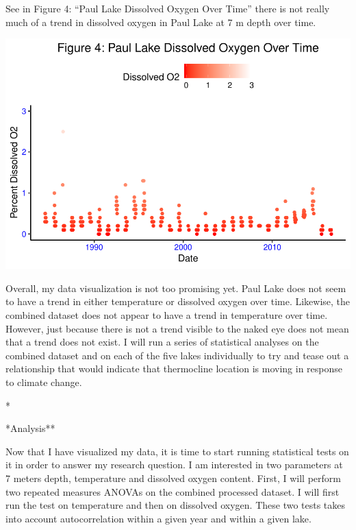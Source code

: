\documentclass[12pt,]{article}
\begin{document}
See in Figure 4: ``Paul Lake Dissolved Oxygen Over Time'' there is not
really much of a trend in dissolved oxygen in Paul Lake at 7 m depth
over time.

\includegraphics{KBollt_ENV872_FinalProject_files/figure-latex/visualization4-1.pdf}

Overall, my data visualization is not too promising yet. Paul Lake does
not seem to have a trend in either temperature or dissolved oxygen over
time. Likewise, the combined dataset does not appear to have a trend in
temperature over time. However, just because there is not a trend
visible to the naked eye does not mean that a trend does not exist. I
will run a series of statistical analyses on the combined dataset and on
each of the five lakes individually to try and tease out a relationship
that would indicate that thermocline location is moving in response to
climate change.

\newpage
*

*Analysis**

Now that I have visualized my data, it is time to start running
statistical tests on it in order to answer my research question. I am
interested in two parameters at 7 meters depth, temperature and
dissolved oxygen content. First, I will perform two repeated measures
ANOVAs on the combined processed dataset. I will first run the test on
temperature and then on dissolved oxygen. These two tests takes into
account autocorrelation within a given year and within a given lake.
\end{document}
